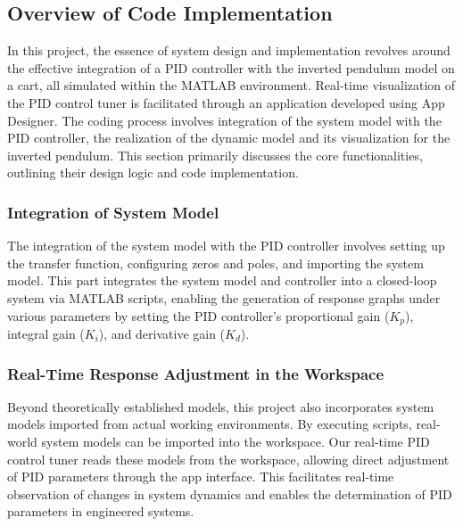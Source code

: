 \documentclass[journal,twoside,web]{ieeecolor}
\begin{document}
\subsection{Overview of Code Implementation}
In this project, the essence of system design and implementation revolves around the effective integration of a PID controller with the inverted pendulum model on a cart, all simulated within the MATLAB environment. Real-time visualization of the PID control tuner is facilitated through an application developed using App Designer. The coding process involves integration of the system model with the PID controller,  the realization of the dynamic model and its visualization for the inverted pendulum. This section primarily discusses the core functionalities, outlining their design logic and code implementation.


\subsubsection{Integration of System Model}
The integration of the system model with the PID controller involves setting up the transfer function, configuring zeros and poles, and importing the system model. This part integrates the system model and controller into a closed-loop system via MATLAB scripts, enabling the generation of response graphs under various parameters by setting the PID controller’s proportional gain ($K_p$), integral gain ($K_i$), and derivative gain ($K_d$).

\subsubsection{Real-Time Response Adjustment in the Workspace}
Beyond theoretically established models, this project also incorporates system models imported from actual working environments. By executing scripts, real-world system models can be imported into the workspace. Our real-time PID control tuner reads these models from the workspace, allowing direct adjustment of PID parameters through the app interface. This facilitates real-time observation of changes in system dynamics and enables the determination of PID parameters in engineered systems.
\end{document}
